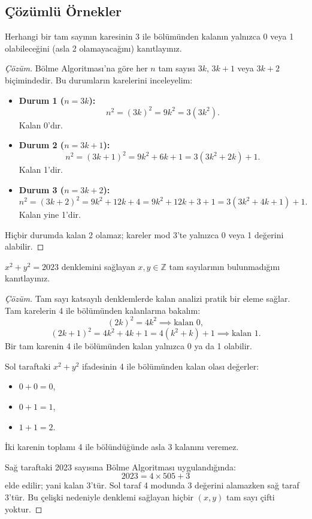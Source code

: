 \subsection{Çözümlü Örnekler}

\begin{example}
Herhangi bir tam sayının karesinin 3 ile bölümünden kalanın yalnızca 0 veya 1 olabileceğini (asla 2 olamayacağını) kanıtlayınız.
\end{example}

\begin{proof}[Çözüm]
Bölme Algoritması'na göre her $n$ tam sayısı $3k$, $3k+1$ veya $3k+2$ biçimindedir. Bu durumların karelerini inceleyelim:
\begin{itemize}
    \item \textbf{Durum 1 ($n = 3k$):}
    \[
    n^2 = (3k)^2 = 9k^2 = 3(3k^2).
    \]
    Kalan 0'dır.
    \item \textbf{Durum 2 ($n = 3k+1$):}
    \[
    n^2 = (3k+1)^2 = 9k^2 + 6k + 1 = 3(3k^2 + 2k) + 1.
    \]
    Kalan 1'dir.
    \item \textbf{Durum 3 ($n = 3k+2$):}
    \[
    n^2 = (3k+2)^2 = 9k^2 + 12k + 4 = 9k^2 + 12k + 3 + 1 = 3(3k^2 + 4k + 1) + 1.
    \]
    Kalan yine 1'dir.
\end{itemize}
Hiçbir durumda kalan 2 olamaz; kareler mod 3'te yalnızca 0 veya 1 değerini alabilir.
\end{proof}

\begin{example}
$x^2 + y^2 = 2023$ denklemini sağlayan $x, y \in \mathbb{Z}$ tam sayılarının bulunmadığını kanıtlayınız.
\end{example}

\begin{proof}[Çözüm]
Tam sayı katsayılı denklemlerde kalan analizi pratik bir eleme sağlar. Tam karelerin 4 ile bölümünden kalanlarına bakalım:
\[
(2k)^2 = 4k^2 \implies \text{kalan } 0,
\]
\[
(2k+1)^2 = 4k^2 + 4k + 1 = 4(k^2+k) + 1 \implies \text{kalan } 1.
\]
Bir tam karenin 4 ile bölümünden kalan yalnızca 0 ya da 1 olabilir.

Sol taraftaki $x^2 + y^2$ ifadesinin 4 ile bölümünden kalan olası değerler:
\begin{itemize}
    \item $0 + 0 = 0$,
    \item $0 + 1 = 1$,
    \item $1 + 1 = 2$.
\end{itemize}
İki karenin toplamı 4 ile bölündüğünde asla 3 kalanını veremez.

Sağ taraftaki 2023 sayısına Bölme Algoritması uygulandığında:
\[
2023 = 4 \times 505 + 3
\]
elde edilir; yani kalan 3'tür. Sol taraf 4 modunda 3 değerini alamazken sağ taraf 3'tür. Bu çelişki nedeniyle denklemi sağlayan hiçbir $(x, y)$ tam sayı çifti yoktur.
\end{proof}

